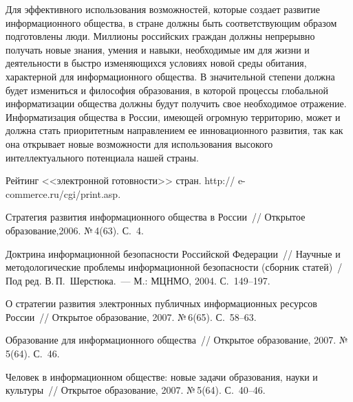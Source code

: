 \begin{multicols}{2}
   Для эффективного использования возможностей, которые создает развитие
информационного общества, в стране должны быть соответствующим образом
подготовлены люди. Миллионы российских граждан должны непрерывно получать новые
знания, умения и навыки, необходимые им для жизни и деятельности в быстро
изменяющихся условиях новой среды обитания, характерной для информационного
общества. В значительной степени должна будет измениться и философия образования, в
которой процессы глобальной информатизации общества должны будут получить свое
необходимое отражение.
%
   Информатизация общества в России, имеющей огромную территорию, может и
должна стать приоритетным направлением ее инновационного развития, так как она
открывает новые возможности для использования высокого интеллектуального
потенциала нашей страны.

\vspace*{-7pt}

{\small\frenchspacing
{%


\begin{thebibliography}{9}

  Рейтинг <<электронной готовности>> стран.  {\sf http://}\linebreak 
{\sf e-commerce.ru/cgi/print.asp.}

Стратегия развития информационного общества в России~// 
Открытое образование,2006. №\,4(63). С.~4. %

Доктрина информационной безопасности Российской Федерации~// Научные и
методологические проблемы информационной безопасности (сборник статей)~/ Под
ред. В.\,П.~Шерстюка.~--- М.: МЦНМО, 2004. С.~149--197.

О стратегии развития электронных публичных информационных ресурсов России~//
Открытое образование, 2007. №\,6(65). С.~58--63.

Образование для информационного общества~// Открытое образование, 2007. №\,5(64). С.~46. %

\label{end\stat}

 Человек в информационном обществе: новые задачи образования, науки и культуры~//
Открытое образование, 2007. №\,5(64). С.~40--46.
\end{thebibliography}

}
}
\end{multicols}